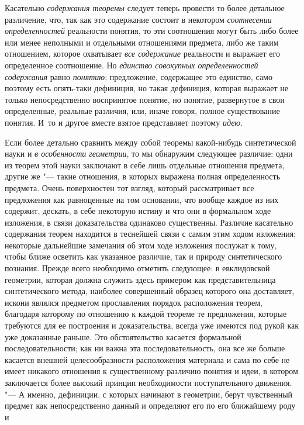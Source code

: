 Касательно {\em содержания
теоремы} следует теперь провести то более детальное
различение, что, так как это содержание состоит в некотором
{\em соотнесении определенностей}
реальности понятия, то эти соотношения могут быть либо более
или менее неполными и отдельными отношениями предмета, либо же таким
отношением, которое охватывает {\em все
содержание} реальности и выражает его определенное
соотношение. Но {\em единство совокупных
определенностей содержания} равно
{\em понятию};
предложение, содержащее это единство, само поэтому есть
опять-таки дефиниция, но такая дефиниция, которая выражает не только
непосредственно воспринятое понятие, но понятие, развернутое в свои
определенные, реальные различия, или, иначе говоря, полное существование
понятия. И~то и другое вместе взятое представляет поэтому
{\em идею}.

Если более детально сравнить между собой теоремы какой-нибудь
синтетической науки и {\em в особенности
геометрии}, то мы обнаружим следующее различие: одни из
теорем этой науки заключают в себе лишь отдельные отношения предмета,
другие же "--- такие отношения, в которых выражена полная
определенность предмета. Очень поверхностен тот взгляд, который
рассматривает все предложения как равноценные на том основании, что вообще
каждое из них содержит, дескать, в себе некоторую истину и что они в
формальном ходе изложения, в связи доказательства одинаково существенны.
Различие касательно содержания теорем находится в теснейшей связи с самим
этим ходом изложения; некоторые дальнейшие замечания об этом ходе изложения
послужат к тому, чтобы ближе осветить как указанное
различие, так и природу синтетического познания. Прежде всего необходимо
отметить следующее: в евклидовской геометрии, которая должна служить здесь
примером как представительница синтетического метода, наиболее совершенный
образец которого она доставляет, искони являлся предметом прославления
порядок расположения теорем, благодаря которому по отношению к каждой
теореме те предложения, которые требуются для ее построения и
доказательства, всегда уже имеются под рукой как уже доказанные раньше. Это
обстоятельство касается формальной последовательности; как ни важна эта
последовательность, она все же больше касается внешней целесообразности
расположения материала и сама по себе не имеет никакого отношения к
существенному различию понятия и идеи, в котором заключается более высокий
принцип необходимости поступательного движения. "--- А именно,
дефиниции, с которых начинают в геометрии, берут чувственный предмет как
непосредственно данный и определяют его по его ближайшему роду и

